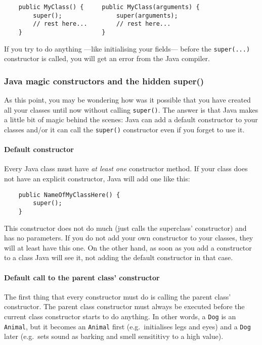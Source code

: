\begin{verbatim}
    public MyClass() {     public MyClass(arguments) {
        super();               super(arguments);
        // rest here...        // rest here...    
    }                      }
\end{verbatim}

If you try to do anything ---like initialising your fields--- before
the \verb+super(...)+ constructor is called, you will get an error
from the Java compiler. 

\subsubsection*{Java magic constructors and the hidden super()}
\label{sec:hidden-super}

As this point, you may be wondering how was it possible that you have
created all your classes until now without calling \verb+super()+. The
answer is that Java makes a little bit of magic behind the scenes:
Java can add a default constructor to your classes and/or it can call
the \verb+super()+ constructor even if you forget to use it. 

\paragraph{Default constructor}
\label{sec:default-constructor}

Every Java class must have \emph{at least one} constructor method. If your
class does not have an explicit constructor, Java will add one like
this: 

\begin{verbatim}
    public NameOfMyClassHere() {
        super();
    }
\end{verbatim}

This constructor does not do much (just calls the superclass'
constructor) and has no parameters. If you do not add your own
constructor to your classes, they will at least have this one. On the
other hand, as soon as you add a constructor to a class Java will see
it, not adding the default constructor in that case.

\paragraph{Default call to the parent class' constructor}
\label{sec:default-call-parent}

The first thing that every constructor must do is calling the parent
class' constructor. The parent class constructor must always be
executed before the current class constructor starts to do
anything. In other words, a \verb+Dog+ is an \verb+Animal+, but it
becomes an \verb+Animal+ first (e.g.~initialises legs and eyes) and a
\verb+Dog+ later (e.g.~sets sound as barking and smell sensititivy to
a high value).

